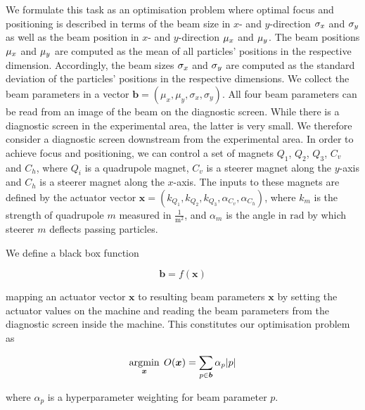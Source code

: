 We formulate this task as an optimisation problem where optimal focus and positioning is described in terms of the beam size in $x$- and $y$-direction $\sigma_x$ and $\sigma_y$ as well as the beam position in $x$- and $y$-direction $\mu_x$ and $\mu_y$. The beam positions $\mu_x$ and $\mu_y$ are computed as the mean of all particles' positions in the respective dimension. Accordingly, the beam sizes $\sigma_x$ and $\sigma_y$ are computed as the standard deviation of the particles' positions in the respective dimensions. We collect the beam parameters in a vector $\bm{b} = (\mu_x, \mu_y, \sigma_x, \sigma_y)$. All four beam parameters can be read from an image of the beam on the diagnostic screen. While there is a diagnostic screen in the experimental area, the latter is very small. We therefore consider a diagnostic screen downstream from the experimental area. In order to achieve focus and positioning, we can control a set of magnets $Q_1$, $Q_2$, $Q_3$, $C_v$ and $C_h$, where $Q_i$ is a quadrupole magnet, $C_v$ is a steerer magnet along the $y$-axis and $C_h$ is a steerer magnet along the $x$-axis. The inputs to these magnets are defined by the actuator vector $\bm{x} = (k_{Q_1}, k_{Q_2}, k_{Q_3}, \alpha_{C_v}, \alpha_{C_h})$, where $k_m$ is the strength of quadrupole $m$ measured in $\frac{1}{\text{m}^2}$, and $\alpha_m$ is the angle in $\text{rad}$ by which steerer $m$ deflects passing particles.

We define a black box function

\begin{equation}
    \bm{b} = f(\bm{x})
\end{equation}

mapping an actuator vector $\bm{x}$ to resulting beam parameters $\bm{x}$ by setting the actuator values on the machine and reading the beam parameters from the diagnostic screen inside the machine. This constitutes our optimisation problem as

\begin{equation}
    \operatorname*{\arg\!\min}_{\bm{x}} \; O(\bm{x}) = \sum_{p \in \bm{b}} \alpha_p |p|
\end{equation}

where $\alpha_p$ is a hyperparameter weighting for beam parameter $p$.

